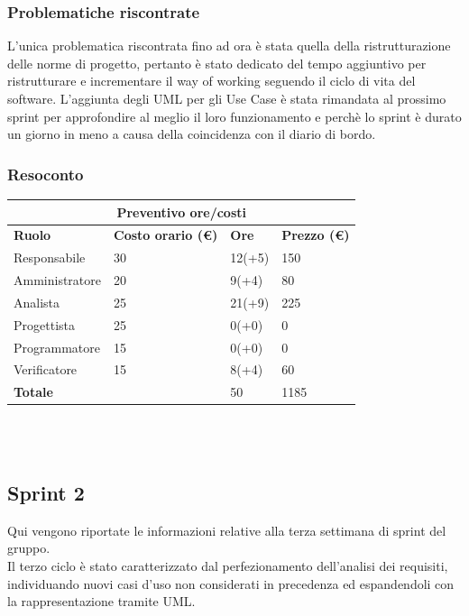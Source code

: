 \documentclass[12pt]{article}
\begin{document}
\subsubsection{Problematiche riscontrate}
L'unica problematica riscontrata fino ad ora è stata quella della ristrutturazione delle norme di progetto, pertanto è stato dedicato del tempo aggiuntivo per ristrutturare e incrementare il way of working seguendo il ciclo di vita del software.
L'aggiunta degli UML per gli Use Case è stata rimandata al prossimo sprint per approfondire al meglio il loro funzionamento e perchè lo sprint è durato un giorno in meno a causa della coincidenza con il diario di bordo.
\subsubsection{Resoconto}
\begin{center}
	\begin{tabularx}{\textwidth}{|X|X|X|X|}
		\hline
		\multicolumn{4}{|c|}{\textbf{Preventivo ore/costi}}                                      \\
		\hline
		\hline
		\textbf{Ruolo}  & \textbf{Costo orario (\euro)} & \textbf{Ore} & \textbf{Prezzo (\euro)} \\
		\hline
		Responsabile    & 30                            & 12(+5)       & 150                     \\
		\hline
		Amministratore  & 20                            & 9(+4)        & 80                      \\
		\hline
		Analista        & 25                            & 21(+9)       & 225                     \\
		\hline
		Progettista     & 25                            & 0(+0)        & 0                       \\
		\hline
		Programmatore   & 15                            & 0(+0)        & 0                       \\
		\hline
		Verificatore    & 15                            & 8(+4)        & 60                      \\
		\hline
		\hline
		\textbf{Totale} &                               & 50           & 1185                    \\
		\hline
	\end{tabularx}\\[8pt]
	\mbox{}\\
\end{center}


\subsection{Sprint 2}
Qui vengono riportate le informazioni relative alla terza settimana di sprint del gruppo. \\
Il terzo ciclo è stato caratterizzato dal perfezionamento dell'analisi dei requisiti, individuando nuovi casi d'uso non considerati in precedenza ed espandendoli con la rappresentazione tramite UML.\\
\end{document}
